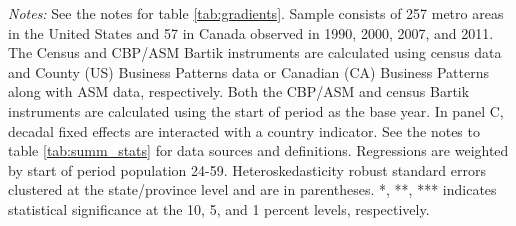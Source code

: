\begin{table}[!htbp]
\begin{threeparttable}
\begin{tablenotes}
\item \textit{Notes:} See the notes for table \ref{tab:gradients}. Sample consists of 257 metro areas in the United States and 57 in Canada observed  in  1990, 2000, 2007, and 2011. The Census and CBP/ASM Bartik instruments are calculated using census data and County (US) Business Patterns data or Canadian (CA) Business Patterns along with ASM data, respectively. Both the CBP/ASM and census Bartik instruments are calculated using the start of period as the base year. In panel C, decadal fixed effects are interacted with a country indicator. See the notes to table \ref{tab:summ_stats} for data sources and definitions. Regressions are  weighted by start of period population 24-59. Heteroskedasticity robust standard errors clustered at the state/province level and are in parentheses. *, **, *** indicates statistical significance at the 10, 5, and 1 percent levels, respectively.
\end{tablenotes}
\end{threeparttable}
\end{table} 



